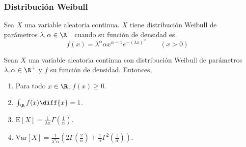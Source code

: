\subsubsection{Distribución Weibull}
\begin{Def}
  Sea $X$ una variable aleatoria continua. $X$ tiene distribución Weibull
  de parámetros $\lambda,\alpha\in\R^+$ cuando su función de densidad
  es
  \[
    f(x) = \lambda^\alpha\alpha x^{\alpha-1}e^{-(\lambda x)^\alpha}
    \qquad (x > 0)
  \]
\end{Def}
\begin{Teo}
  Sean $X$ una variable aleatoria continua con distribución Weibull de parámetros
  $\lambda,\alpha\in\R^+$ y $f$ su función de densidad. Entonces,
  \begin{enumerate}
    \item Para todo $x\in\R$, $f(x)\geq0$.
    \item $\int_{\R}f(x)\diff{x}=1$.
    \item $\text{E}[X]=\frac{1}{\lambda\alpha}
    \Gamma\left(\frac{1}{\alpha}\right)$.
    \item $\text{Var}[X]=\frac{1}{\lambda^2\alpha}\left(
      2\Gamma\left(\frac{2}{\alpha}\right)
      + \frac{1}{\alpha}\Gamma^2\left(\frac{1}{\alpha}\right)
    \right)$.
  \end{enumerate}
\end{Teo}
